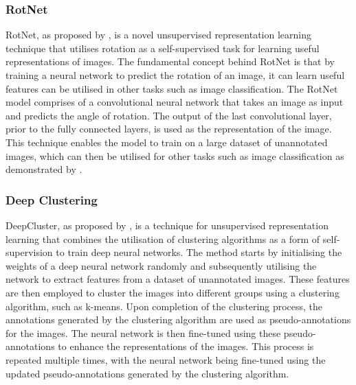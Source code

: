 \subsubsection{RotNet}
\label{subsubsec:RotNet}
RotNet, as proposed by \cite{gidaris2018unsupervised}, is a novel unsupervised representation learning technique that utilises rotation as a self-supervised task for learning useful representations of images. The fundamental concept behind RotNet is that by training a neural network to predict the rotation of an image, it can learn useful features can be utilised in other tasks such as image classification. The RotNet model comprises of a convolutional neural network that takes an image as input and predicts the angle of rotation. The output of the last convolutional layer, prior to the fully connected layers, is used as the representation of the image. This technique enables the model to train on a large dataset of unannotated images, which can then be utilised for other tasks such as image classification as demonstrated by \cite{zhou2021preservational}.

\subsubsection{Deep Clustering}
\label{subsubsec:deep_clustering}
DeepCluster, as proposed by \cite{caron2018deep}, is a technique for unsupervised representation learning that combines the utilisation of clustering algorithms as a form of self-supervision to train deep neural networks. The method starts by initialising the weights of a deep neural network randomly and subsequently utilising the network to extract features from a dataset of unannotated images. These features are then employed to cluster the images into different groups using a clustering algorithm, such as k-means. Upon completion of the clustering process, the annotations generated by the clustering algorithm are used as pseudo-annotations for the images. The neural network is then fine-tuned using these pseudo-annotations to enhance the representations of the images. This process is repeated multiple times, with the neural network being fine-tuned using the updated pseudo-annotations generated by the clustering algorithm.

